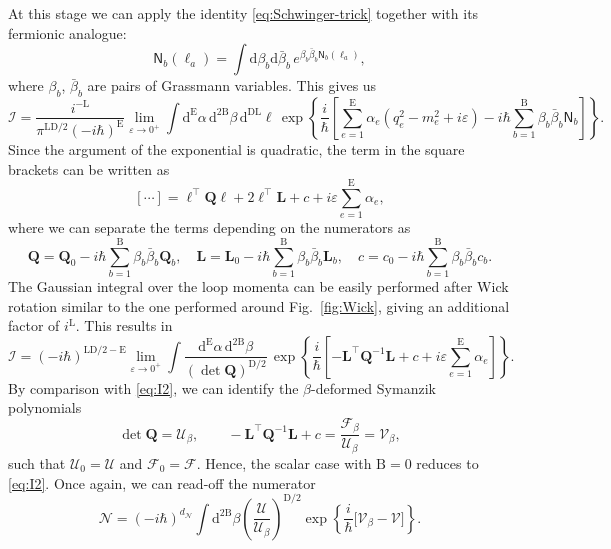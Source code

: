 \documentclass[12pt]{article}
\numberwithin{figure}{section}
\def \be {\begin{equation}}
\def \ee {\end{equation}}
\def \D {\mathrm{D}}
\def \E {\mathrm{E}}
\def \L {\mathrm{L}}
\def \U {\mathcal{U}}
\def \F {\mathcal{F}}
\def \d {\mathrm{d}}
\def \eps {\varepsilon}
\def \V {\mathcal{V}}
\def \I {\mathcal{I}}
\def \N {\mathcal{N}}
\def \B {\mathrm{B}}
\newcommand*\Bell{\ensuremath{\boldsymbol\ell}}
\begin{document}
At this stage we can apply the identity \eqref{eq:Schwinger-trick} together with its fermionic analogue:
%
\be
\mathsf{N}_b(\ell_a) = \int \d\beta_b \d\bar{\beta}_b\, e^{ \beta_b \bar{\beta}_b \mathsf{N}_b(\ell_a)},
\ee
%
where $\beta_b$, $\bar{\beta}_b$ are pairs of Grassmann variables. This gives us
%
\be
\label{eq:I-Schwinger-2}
\I = \frac{ i^{-\L}}{\pi^{\L\D/2} (-i\hbar)^{\E}} \lim_{\eps \to 0^+} \int \!\!\d^{\E}\alpha\, \d^{2\mathrm{B}}\beta\, \d^{\D\L} \ell\, \exp \left\{ \! \frac{i}{\hbar} \left[ \sum_{e=1}^{\E} \alpha_e (q_e^2 {-} m_e^2 {+} i\eps) - i\hbar\sum_{b=1}^{\mathrm{B}} \beta_b \bar{\beta}_b \mathsf{N}_b \right] \! \right\} \!.
\ee
%
Since the argument of the exponential is quadratic, the term in the square brackets can be written as
%
\be\label{eq:I-Schwinger}
\left[ \cdots \right] = \Bell^{\intercal} \mathbf{Q} \Bell + 2\Bell^\intercal \mathbf{L} + c + i\eps \sum_{e=1}^{\E} \alpha_e,
\ee
%
where we can separate the terms depending on the numerators as
%
\be
\mathbf{Q} = \mathbf{Q}_0 - i\hbar\sum_{b=1}^{\mathrm{B}} \beta_b \bar{\beta}_b \mathbf{Q}_b, \quad \mathbf{L} = \mathbf{L}_0 -  i\hbar\sum_{b=1}^{\mathrm{B}} \beta_b \bar{\beta}_b \mathbf{L}_b, \quad c = c_0 -  i\hbar\sum_{b=1}^{\mathrm{B}} \beta_b \bar{\beta}_b c_b.
\ee
%
The Gaussian integral over the loop momenta can be easily performed after Wick rotation similar to the one performed around Fig.~\ref{fig:Wick}, giving an additional factor of $i^\L$. This results in
%
\be
\I =  (-i\hbar)^{\L\D/2-\E} \lim_{\eps \to 0^+} \int  \frac{\d^{\E}\alpha\, \d^{2\mathrm{B}}\beta}{(\det \mathbf{Q})^{\D/2}}\, \exp \left\{ \frac{i}{\hbar} \left[ - \mathbf{L}^\intercal \mathbf{Q}^{-1} \mathbf{L} + c + i\eps {\textstyle\sum}_{e=1}^{\E} \alpha_e\right] \right\}.
\ee
%
By comparison with \eqref{eq:I2}, we can identify the $\beta$-deformed Symanzik polynomials
%
\be
\det \mathbf{Q} = \U_{\beta}, \qquad - \mathbf{L}^\intercal \mathbf{Q}^{-1} \mathbf{L} + c = \frac{ \F_\beta}{\U_\beta} = \V_\beta,
\ee
%
such that $\U_0 = \U$ and $\F_0 = \F$. Hence, the scalar case with $\B=0$ reduces to \eqref{eq:I2}. Once again, we can read-off the numerator
%
\be
\boxed{
\N =  (-i\hbar)^{d_\N} \int \d^{2\B} \beta \left(\frac{\U}{\U_\beta}\right)^{\D/2} \exp \left\{ \frac{i}{\hbar} \big[\V_\beta - \V\big] \right\}.}
\ee
%
\end{document}
